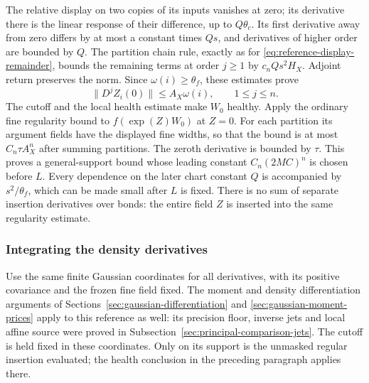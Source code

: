 The relative display on two copies of its inputs vanishes at zero;
its derivative there is the linear response of their difference, up to
$Q\theta_c$. Its first derivative away from zero differs by at most
a constant times $Qs$, and derivatives of higher order are bounded by
$Q$. The partition chain rule, exactly as for
\eqref{eq:reference-display-remainder}, bounds the remaining terms
at order $j\ge1$ by $c_nQs^2H_X$. Adjoint return preserves the norm.
Since $\omega(i)\ge\theta_f$, these estimates prove
\[
                  \|D^jZ_i(0)\|\le A_X\omega(i),
                         \qquad 1\le j\le n.
\]
The cutoff and the local health estimate make $W_0$ healthy. Apply the
ordinary fine regularity bound to $f(\exp(Z)W_0)$ at $Z=0$.
For each partition its argument fields have the displayed fine widths,
so that the bound is at most $C_n\tau A_X^n$ after summing partitions.
The zeroth derivative is bounded by $\tau$. This proves a general-support
bound whose leading constant $C_n(2MC)^n$ is chosen before $L$.
Every dependence on the later chart constant $Q$ is accompanied by
$s^2/\theta_f$, which can be made small after $L$ is fixed.
There is no sum of separate insertion derivatives over bonds: the
entire field $Z$ is inserted into the same regularity estimate.

\subsubsection{Integrating the density derivatives}
Use the same finite Gaussian coordinates for all derivatives,
with its positive covariance and the frozen fine field fixed.
The moment and density differentiation arguments of
Sections~\ref{sec:gaussian-differentiation} and
\ref{sec:gaussian-moment-prices} apply to this reference as well:
its precision floor, inverse jets and local affine source were
proved in Subsection~\ref{sec:principal-comparison-jets}. The cutoff
is held fixed in these coordinates. Only on its support is the
unmasked regular insertion evaluated; the health conclusion in
the preceding paragraph applies there.

